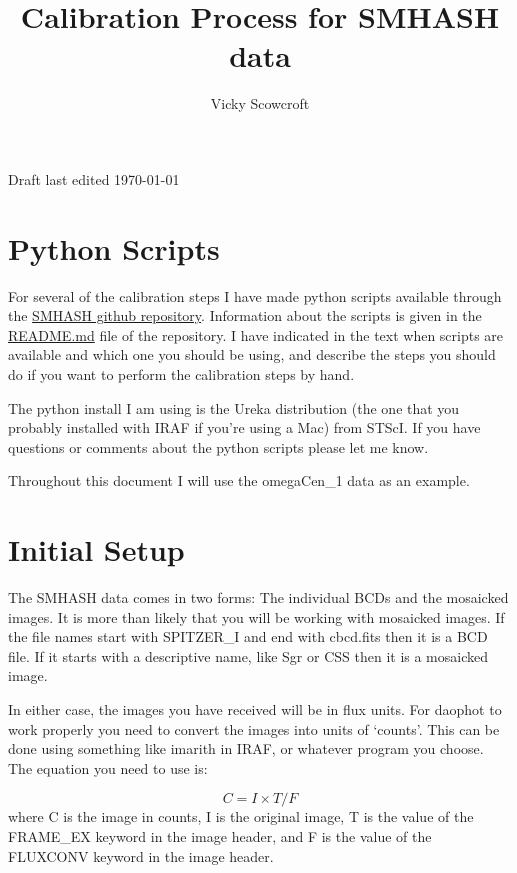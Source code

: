 \documentclass[11pt]{article}
\title{Calibration Process for SMHASH data}
\author{Vicky Scowcroft }
\begin{document}
\maketitle
Draft last edited \today

\section{Python Scripts}
\label{sec:scripts}

For several of the calibration steps I have made python scripts available through the \href{https://github.com/vickyscowcroft/smhash_code}{SMHASH github repository}. Information about the scripts is given in the \href{https://github.com/vickyscowcroft/smhash_code/blob/master/README.md}{README.md} file of the repository. I have indicated in the text when scripts are available and which one you should be using, and describe the steps you should do if you want to perform the calibration steps by hand. 

The python install I am using is the Ureka distribution (the one that you probably installed with IRAF if you're using a Mac) from STScI. If you have questions or comments about the python scripts please let me know.

Throughout this document I will use the omegaCen\_1 data as an example. 

\section{Initial Setup}
\label{sec:initial}
The SMHASH data comes in two forms: The individual BCDs and the mosaicked images. It is more than likely that you will be working with mosaicked images. If the file names start with SPITZER\_I and end with cbcd.fits then it is a BCD file. If it starts with a descriptive name, like Sgr or CSS then it is a mosaicked image.

In either case, the images you have received will be in flux units. For daophot to work properly you need to convert the images into units of `counts'. This can be done using something like imarith in IRAF, or whatever program you choose. The equation you need to use is:

\begin{equation}
C = I \times T / F
\end{equation}
\label{eqn:conv_to_counts}
where C is the image in counts, I is the original image, T is the value of the FRAME\_EX keyword in the image header, and F is the value of the FLUXCONV keyword in the image header. 
\end{document}
